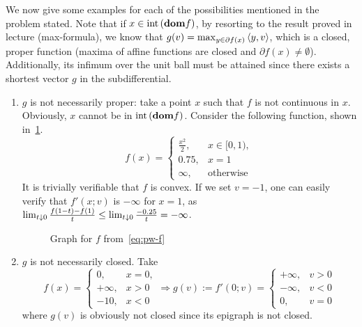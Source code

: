 \documentclass[10pt]{article}
\begin{document}
\begin{Exercise}
    We now give some examples for each of the possibilities mentioned in the
    problem stated. Note that if $x \in \mathrm{int}\left( \textbf{dom} f \right)$, by resorting to the
    result proved in lecture (max-formula), we know that $g(v) =
    \max_{y \in \partial f(x)} \left\langle y, v \right\rangle$, which is a closed, proper function
    (maxima of affine functions are closed and $\partial f(x)
    \neq \emptyset$). Additionally, its infimum over the unit ball must be
    attained since there exists a shortest vector $g$ in the subdifferential.
    \begin{enumerate}
    \item $g$ is not necessarily proper: take a point $x$ such that $f$ is not
    continuous in $x$. Obviously, $x$ cannot be in $\mathrm{int}\left( \textbf{dom} f \right)$. Consider
    the following function, shown in~\cref{fig:pw-f}.
    \begin{equation}
        f(x) = \begin{cases}
            \frac{x^2}{2}, & x \in [0, 1), \\
            0.75, & x = 1 \\
            \infty, & \text{otherwise}
        \end{cases}
        \label{eq:pw-f}
    \end{equation}
    It is trivially verifiable that $f$ is convex. If we set $v = -1$, one can
    easily verify that $f'(x; v)$ is $-\infty$ for $x = 1$, as $\lim_{t \downarrow 0}
    \frac{f(1 - t) - f(1)}{t} \leq \lim_{t \downarrow 0} \frac{-0.25}{t} = -\infty$.
    \begin{figure}[h]
        \centering
        \caption{Graph for $f$ from~\cref{eq:pw-f}}
        \label{fig:pw-f}
    \end{figure}
    \item $g$ is not necessarily closed. Take
        \[
            f(x) = \begin{cases}
                0, & x = 0, \\
                +\infty, & x > 0 \\
                -10, & x < 0
            \end{cases} \Rightarrow
            g(v) := f'(0; v) = \begin{cases}
                +\infty, & v > 0 \\
                -\infty, & v < 0 \\
                0, & v = 0
            \end{cases}
        \]
        where $g(v)$ is obviously not closed since its epigraph is not closed.
    \end{enumerate}
\end{Exercise}
\end{document}
